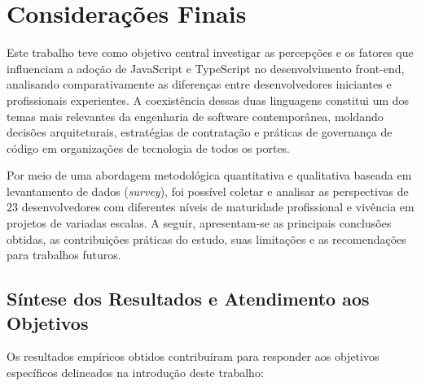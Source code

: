 \chapter{Considerações Finais}
\label{chap:conclusao}

Este trabalho teve como objetivo central investigar as percepções e os fatores que influenciam a adoção de JavaScript e TypeScript no desenvolvimento front-end, analisando comparativamente as diferenças entre desenvolvedores iniciantes e profissionais experientes. A coexistência dessas duas linguagens constitui um dos temas mais relevantes da engenharia de software contemporânea, moldando decisões arquiteturais, estratégias de contratação e práticas de governança de código em organizações de tecnologia de todos os portes.

Por meio de uma abordagem metodológica quantitativa e qualitativa baseada em levantamento de dados (\textit{survey}), foi possível coletar e analisar as perspectivas de $23$ desenvolvedores com diferentes níveis de maturidade profissional e vivência em projetos de variadas escalas. A seguir, apresentam-se as principais conclusões obtidas, as contribuições práticas do estudo, suas limitações e as recomendações para trabalhos futuros.

\section{Síntese dos Resultados e Atendimento aos Objetivos}
\label{sec:conclusao_objetivos}

Os resultados empíricos obtidos contribuíram para responder aos objetivos específicos delineados na introdução deste trabalho:

